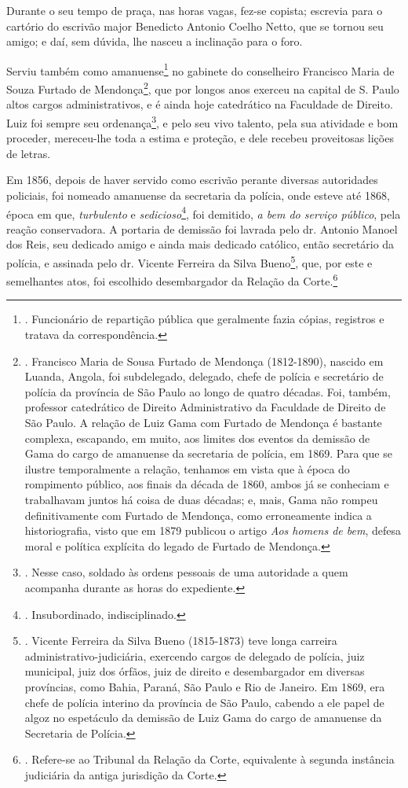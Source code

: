 Durante o seu tempo de praça, nas horas vagas, fez-se copista; escrevia
para o cartório do escrivão major Benedicto Antonio Coelho Netto, que se
tornou seu amigo; e daí, sem dúvida, lhe nasceu a inclinação para o
foro.

Serviu também como amanuense\footnote{. Funcionário de repartição
  pública que geralmente fazia cópias, registros e tratava da
  correspondência.} no gabinete do conselheiro Francisco Maria de Souza
Furtado de Mendonça\footnote{. Francisco Maria de Sousa Furtado de
  Mendonça (1812-1890), nascido em Luanda, Angola, foi subdelegado,
  delegado, chefe de polícia e secretário de polícia da província de São
  Paulo ao longo de quatro décadas. Foi, também, professor catedrático
  de Direito Administrativo da Faculdade de Direito de São Paulo. A
  relação de Luiz Gama com Furtado de Mendonça é bastante complexa,
  escapando, em muito, aos limites dos eventos da demissão de Gama do
  cargo de amanuense da secretaria de polícia, em 1869. Para que se
  ilustre temporalmente a relação, tenhamos em vista que à época do
  rompimento público, aos finais da década de 1860, ambos já se
  conheciam e trabalhavam juntos há coisa de duas décadas; e, mais, Gama
  não rompeu definitivamente com Furtado de Mendonça, como erroneamente
  indica a historiografia, visto que em 1879 publicou o artigo \emph{Aos
  homens de bem}, defesa moral e política explícita do legado de Furtado
  de Mendonça.}, que por longos anos exerceu na capital de S. Paulo
altos cargos administrativos, e é ainda hoje catedrático na Faculdade de
Direito. Luiz foi sempre seu ordenança\footnote{. Nesse caso, soldado às
  ordens pessoais de uma autoridade a quem acompanha durante as horas do
  expediente.}, e pelo seu vivo talento, pela sua atividade e bom
proceder, mereceu-lhe toda a estima e proteção, e dele recebeu
proveitosas lições de letras.

Em 1856, depois de haver servido como escrivão perante diversas
autoridades policiais, foi nomeado amanuense da secretaria da polícia,
onde esteve até 1868, época em que, \emph{turbulento} e
\emph{sedicioso}\footnote{. Insubordinado, indisciplinado.}, foi
demitido, \emph{a bem do serviço público}, pela reação conservadora. A
portaria de demissão foi lavrada pelo dr. Antonio Manoel dos Reis, seu
dedicado amigo e ainda mais dedicado católico, então secretário da
polícia, e assinada pelo dr. Vicente Ferreira da Silva Bueno\footnote{.
  Vicente Ferreira da Silva Bueno (1815-1873) teve longa carreira
  administrativo-judiciária, exercendo cargos de delegado de polícia,
  juiz municipal, juiz dos órfãos, juiz de direito e desembargador em
  diversas províncias, como Bahia, Paraná, São Paulo e Rio de Janeiro.
  Em 1869, era chefe de polícia interino da província de São Paulo,
  cabendo a ele papel de algoz no espetáculo da demissão de Luiz Gama do
  cargo de amanuense da Secretaria de Polícia.}, que, por este e
semelhantes atos, foi escolhido desembargador da Relação da
Corte.\footnote{. Refere-se ao Tribunal da Relação da Corte, equivalente
  à segunda instância judiciária da antiga jurisdição da Corte.}

